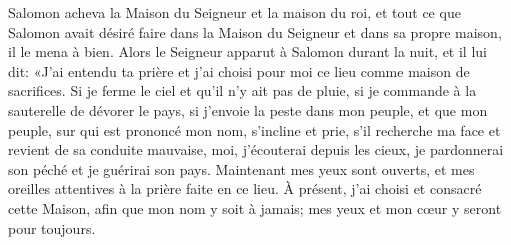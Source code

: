 Salomon acheva la Maison du Seigneur et la maison du roi,
	et tout ce que Salomon avait désiré faire
		dans la Maison du Seigneur et dans sa propre maison,
	il le mena à bien.
Alors le Seigneur apparut à Salomon durant la nuit, et il lui dit:
	«J’ai entendu ta prière et j’ai choisi pour moi ce lieu comme maison de sacrifices.
Si je ferme le ciel et qu’il n’y ait pas de pluie,
	si je commande à la sauterelle de dévorer le pays,
	si j’envoie la peste dans mon peuple,
	et que mon peuple, sur qui est prononcé mon nom, s’incline et prie,
	s’il recherche ma face et revient de sa conduite mauvaise,
	moi, j’écouterai depuis les cieux, je pardonnerai son péché et je guérirai son pays.
Maintenant mes yeux sont ouverts, et mes oreilles attentives à la prière faite en ce lieu.
À présent, j’ai choisi et consacré cette Maison, afin que mon nom y soit à jamais;
	mes yeux et mon cœur y seront pour toujours.
